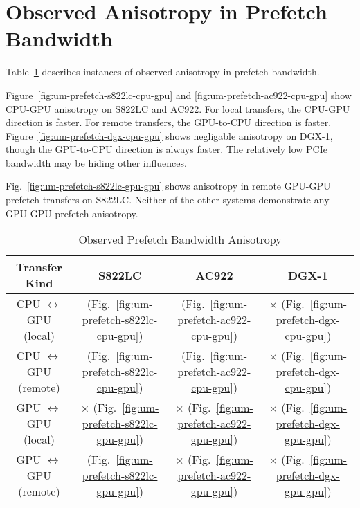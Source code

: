 \section{Observed Anisotropy in Prefetch Bandwidth}

Table~\ref{tab:um-prefetch-anisotropy} describes instances of observed anisotropy in prefetch bandwidth.

Figure~\ref{fig:um-prefetch-s822lc-cpu-gpu} and \ref{fig:um-prefetch-ac922-cpu-gpu} show CPU-GPU anisotropy on S822LC and AC922.
For local transfers, the CPU-GPU direction is faster.
For remote transfers, the GPU-to-CPU direction is faster.
Figure~\ref{fig:um-prefetch-dgx-cpu-gpu} shows negligable anisotropy on DGX-1, though the GPU-to-CPU direction is always faster.
The relatively low PCIe bandwidth may be hiding other influences.

Fig.~\ref{fig:um-prefetch-s822lc-gpu-gpu} shows anisotropy in remote GPU-GPU prefetch transfers on S822LC.
Neither of the other systems demonstrate any GPU-GPU prefetch anisotropy.

\begin{table}[ht]
	\centering
	\caption[]{Observed Prefetch Bandwidth Anisotropy}
	\label{tab:um-prefetch-anisotropy}
	\begin{tabular}{|c|c|c|c|}
		\hline
		\textbf{Transfer Kind}             & \textbf{S822LC}                                         & \textbf{AC922}                                         & \textbf{DGX-1}                            \\ \hline 
		CPU $\leftrightarrow$ GPU (local)  & \checkmark (Fig.~\ref{fig:um-prefetch-s822lc-cpu-gpu}) & \checkmark (Fig.~\ref{fig:um-prefetch-ac922-cpu-gpu}) & $\times$ (Fig.~\ref{fig:um-prefetch-dgx-cpu-gpu}) \\ \hline
		CPU $\leftrightarrow$ GPU (remote) & \checkmark (Fig.~\ref{fig:um-prefetch-s822lc-cpu-gpu}) & \checkmark (Fig.~\ref{fig:um-prefetch-ac922-cpu-gpu}) & $\times$ (Fig.~\ref{fig:um-prefetch-dgx-cpu-gpu}) \\ \hline
		GPU $\leftrightarrow$ GPU (local)  & $\times$   (Fig.~\ref{fig:um-prefetch-s822lc-gpu-gpu}) & $\times$   (Fig.~\ref{fig:um-prefetch-ac922-gpu-gpu}) & $\times$ (Fig.~\ref{fig:um-prefetch-dgx-gpu-gpu}) \\ \hline
		GPU $\leftrightarrow$ GPU (remote) & \checkmark (Fig.~\ref{fig:um-prefetch-s822lc-gpu-gpu}) & $\times$   (Fig.~\ref{fig:um-prefetch-ac922-gpu-gpu}) & $\times$ (Fig.~\ref{fig:um-prefetch-dgx-gpu-gpu}) \\ \hline
	\end{tabular}
\end{table}

